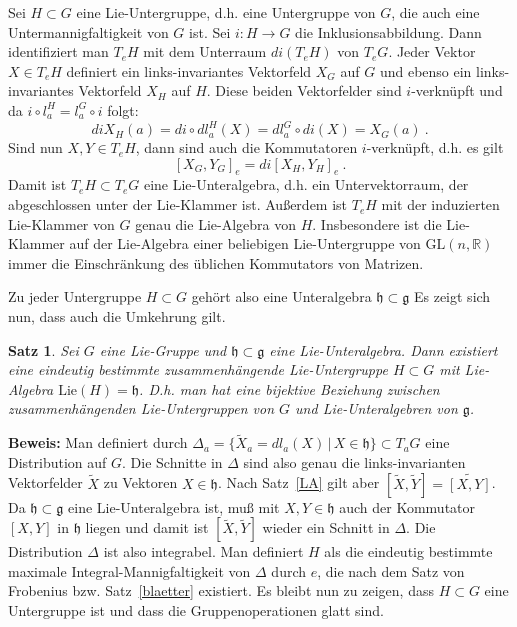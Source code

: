 \documentclass[12pt,a4paper]{article}
\def\R{\mathbb{R}}
\def\GL{\mathrm{GL}}
\def\Lie{\mathrm{Lie}}
\def\g{\mathfrak{g}}
\def\h{\mathfrak{h}}
\newtheorem{Satz}[Lemma]{Satz}
\def\proof{\noindent\textbf{Beweis:}\quad}
\begin{document}
Sei $H\subset G$ eine Lie-Untergruppe, d.h. eine Untergruppe von $G$, die
auch eine Untermannigfaltigkeit von $G$ ist. Sei $i:H \rightarrow G$ die
Inklusionsabbildung. Dann identifiziert man $T_eH$ mit dem Unterraum
$di (T_eH)$ von $T_eG$. Jeder Vektor $X \in T_eH$ definiert ein links-invariantes
Vektorfeld $X_G$ auf $G$ und ebenso ein links-invariantes Vektorfeld
$X_H$ auf $H$. Diese beiden Vektorfelder sind $i$-verkn\"upft
und da $i \circ l^H_a = l^G_a \circ i$ folgt:
$$
di X_H(a) = di \circ dl^H_a(X) = dl^G_a \circ di (X) = X_G(a) \ .
$$
Sind nun $X, Y \in T_eH$, dann sind auch die Kommutatoren $i$-verkn\"upft,
d.h. es gilt
$$
[X_G, Y_G]_e = di [X_H, Y_H]_e \ .
$$
Damit ist $T_eH \subset T_eG$ eine Lie-Unteralgebra, d.h. ein Untervektorraum,
der abgeschlossen unter der Lie-Klammer ist. Au\ss erdem ist $T_eH$ mit der
induzierten Lie-Klammer von $G$ genau die Lie-Algebra von $H$. Insbesondere
ist die Lie-Klammer auf der Lie-Algebra einer beliebigen Lie-Untergruppe
von $\GL(n,\R)$ immer die Einschr\"ankung des \"ublichen Kommutators von
Matrizen.

\medskip

Zu jeder Untergruppe $H\subset G$ geh\"ort also eine Unteralgebra $\h \subset \g$
Es zeigt sich nun, dass auch die Umkehrung gilt.

\begin{Satz}\label{unter}
Sei $G$ eine Lie-Gruppe und $\h \subset \g$ eine Lie-Unteralgebra. Dann existiert
eine eindeutig bestimmte zusammenh\"angende Lie-Untergruppe $H\subset G$ mit Lie-Algebra
$\Lie(H)=\h$. D.h. man hat eine bijektive Beziehung zwischen zusammenh\"angenden
Lie-Untergruppen von $G$ und Lie-Unteralgebren von $\g$.
\end{Satz}
\proof
Man definiert durch $\Delta_a = \{ \tilde X_a = dl_a(X) \,|\, X \in \h \} \subset T_aG$ eine Distribution
auf $G$. Die Schnitte in $\Delta$ sind also genau die links-invarianten Vektorfelder $\tilde X$ zu
Vektoren $X\in \h$. Nach Satz~\ref{LA} gilt aber
$
[\tilde X, \tilde Y] = \widetilde{[X,Y]}
$. Da $\h \subset \g$ eine Lie-Unteralgebra ist, mu\ss{} mit $X,Y\in \h$ auch der Kommutator
$[X,Y]$ in $\h$ liegen und damit ist $[\tilde X, \tilde Y]$ wieder ein Schnitt in $\Delta$.
Die Distribution $\Delta$ ist also integrabel. Man definiert $H$ als die eindeutig bestimmte
maximale Integral-Mannigfaltigkeit von $\Delta$ durch $e$, die nach dem Satz von Frobenius
bzw. Satz~\ref{blaetter} existiert. Es bleibt nun zu zeigen, dass $H\subset G$ eine Untergruppe
ist und dass die Gruppenoperationen glatt sind.
\end{document}
